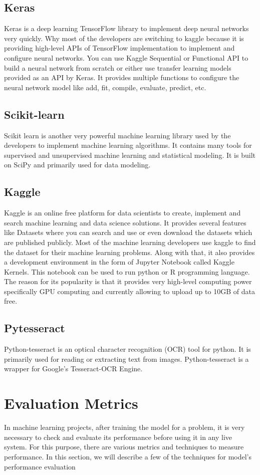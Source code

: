 \subsection{Keras}
Keras is a deep learning TensorFlow library to implement deep neural networks very quickly. Why most of the developers are switching to kaggle because it is providing high-level APIs of TensorFlow implementation to implement and configure neural networks. You can use Kaggle Sequential or Functional API to build a neural network from scratch or either use transfer learning models provided as an API by Keras. It provides multiple functions to configure the neural network model like add, fit, compile, evaluate, predict, etc.
\subsection{Scikit-learn}
Scikit learn is another very powerful machine learning library used by the developers to implement machine learning algorithms. It contains many tools for supervised and unsupervised machine learning and statistical modeling. It is built on SciPy and primarily used for data modeling.
\subsection{Kaggle}
Kaggle is an online free platform for data scientists to create, implement and search machine learning and data science solutions. It provides several features like Datasets where you can search and use or even download the datasets which are published publicly. Most of the machine learning developers use kaggle to find the dataset for their machine learning problems. Along with that, it also provides a development environment in the form of Jupyter Notebook called Kaggle Kernels. This notebook can be used to run python or R programming language. The reason for its popularity is that it provides very high-level computing power specifically GPU computing and currently allowing to upload up to 10GB of data free.
\subsection{Pytesseract}
Python-tesseract is an optical character recognition (OCR) tool for python. It is primarily used for reading or extracting text from images. Python-tesseract is a wrapper for Google's Tesseract-OCR Engine.
\section{Evaluation Metrics}
In machine learning projects, after training the model for a problem, it is very necessary to check and evaluate its performance before using it in any live system. For this purpose, there are various metrics and techniques to measure performance. In this section, we will describe a few of the techniques for model's performance evaluation
